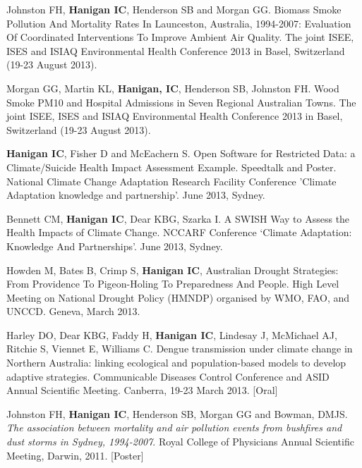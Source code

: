 \documentclass[a4paper,11pt]{article}
\begin{document}
{}
\medskip
\renewcommand{\labelenumi}{\textsc{g}\theenumi.}
\begin{revnumerate}

\item Johnston FH, \textbf{Hanigan IC}, Henderson SB and Morgan GG. Biomass Smoke Pollution And Mortality Rates In Launceston, Australia, 1994-2007: Evaluation Of Coordinated Interventions To Improve Ambient Air Quality.  The joint ISEE, ISES and ISIAQ Environmental Health Conference 2013 in Basel, Switzerland (19-23 August 2013).

\item Morgan GG, Martin KL, \textbf{Hanigan, IC}, Henderson SB, Johnston FH.  Wood Smoke PM10 and Hospital Admissions in Seven Regional Australian Towns.
The joint ISEE, ISES and ISIAQ Environmental Health Conference 2013 in Basel, Switzerland (19-23 August 2013).

\item \textbf{Hanigan IC}, Fisher D and McEachern S. Open Software for Restricted Data: a Climate/Suicide Health Impact Assessment Example. Speedtalk and Poster. National Climate Change Adaptation Research Facility  Conference 'Climate Adaptation knowledge and partnership'. June 2013, Sydney.

\item Bennett CM, \textbf{Hanigan IC}, Dear KBG, Szarka I. A SWISH Way to Assess the Health Impacts of Climate Change. NCCARF Conference ‘Climate Adaptation: Knowledge And Partnerships’. June 2013, Sydney.

\item Howden M, Bates B, Crimp S, \textbf{Hanigan IC}, Australian Drought Strategies: From Providence To Pigeon-Holing To Preparedness And People. High Level Meeting on National Drought Policy (HMNDP) organised by WMO, FAO, and UNCCD. Geneva, March 2013. 

\item Harley DO, Dear KBG, Faddy H, \textbf{Hanigan IC}, Lindesay J, McMichael AJ, Ritchie S, Viennet E, Williams C. Dengue transmission under climate change in Northern Australia: linking ecological and population-based models to develop adaptive strategies. Communicable Diseases Control Conference and ASID Annual Scientific Meeting. Canberra, 19-23 March 2013.  [Oral]

\item Johnston FH, \textbf{Hanigan IC}, Henderson SB, Morgan GG and Bowman, DMJS. \emph{The association between mortality and air pollution events from bushfires and dust storms in Sydney, 1994-2007}. Royal College of Physicians Annual Scientific Meeting, Darwin,  2011. [Poster]


\end{revnumerate}
\end{document}
